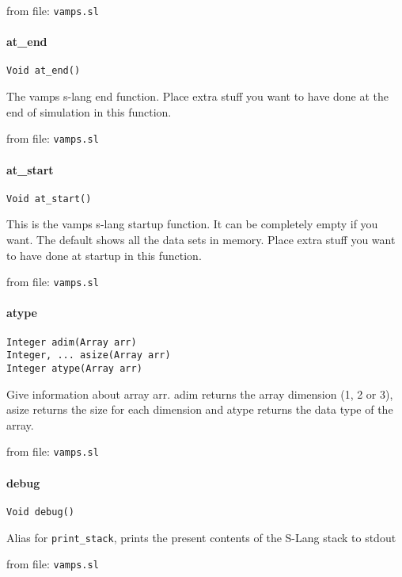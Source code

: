 from file: {\tt vamps.sl}


\paragraph{at\_end}
\begin{verbatim}
Void at_end()
\end{verbatim}
The vamps s-lang end function. Place extra stuff you want to
have done at the end of simulation in this function.

from file: {\tt vamps.sl}


\paragraph{at\_start}
\begin{verbatim}
Void at_start()
\end{verbatim}
This is the vamps s-lang startup function. It can be completely empty
if you want. The default shows all the data sets in memory.
Place extra stuff you want to
have done at startup in this function.

from file: {\tt vamps.sl}


\paragraph{atype}
\begin{verbatim}
Integer adim(Array arr)
Integer, ... asize(Array arr)
Integer atype(Array arr)
\end{verbatim}
Give information about array arr. adim returns the array
dimension (1, 2 or 3), asize returns the size for each
dimension and atype returns the data type of the array.

from file: {\tt vamps.sl}


\paragraph{debug}
\begin{verbatim}
Void debug()
\end{verbatim}
Alias for {\tt print\_stack}, prints the present contents of the S-Lang
stack to stdout

from file: {\tt vamps.sl}


